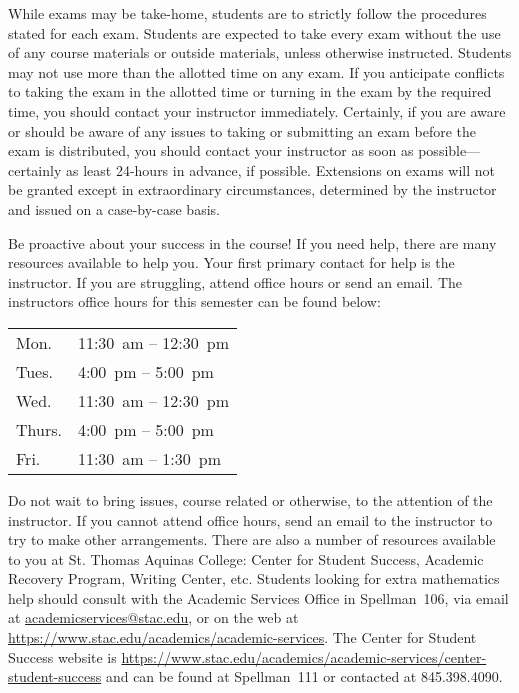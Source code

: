 \documentclass[11pt,letterpaper]{article}
\begin{document}
While exams may be take-home, students are to strictly follow the procedures stated for each exam. Students are expected to take every exam without the use of any course materials or outside materials, unless otherwise instructed. Students may not use more than the allotted time on any exam. If you anticipate conflicts to taking the exam in the allotted time or turning in the exam by the required time, you should contact your instructor immediately. Certainly, if you are aware or should be aware of any issues to taking or submitting an exam before the exam is distributed, you should contact your instructor as soon as possible---certainly as least 24-hours in advance, if possible. Extensions on exams will not be granted except in extraordinary circumstances, determined by the instructor and issued on a case-by-case basis. \sectionbreak



Be proactive about your success in the course! If you need help, there are many resources available to help you. Your first primary contact for help is the instructor. If you are struggling, attend office hours or send an email. The instructors office hours for this semester can be found below: \par
	\begin{table}[!ht]
	\centering
	\begin{tabular}{l || l}
	Mon. & 11:30~am -- 12:30~pm \\
	Tues. & 4:00~pm -- 5:00~pm \\
	Wed. & 11:30~am -- 12:30~pm \\
	Thurs. & 4:00~pm -- 5:00~pm \\
	Fri. & 11:30~am -- 1:30~pm
	\end{tabular}
	\end{table}
Do not wait to bring issues, course related or otherwise, to the attention of the instructor. If you cannot attend office hours, send an email to the instructor to try to make other arrangements. There are also a number of resources available to you at St. Thomas Aquinas College: Center for Student Success, Academic Recovery Program, Writing Center, etc. Students looking for extra mathematics help should consult with the Academic Services Office in Spellman~106, via email at \href{mailto:AcademicServices@stac.edu}{academicservices@stac.edu}, or on the web at \href{https://www.stac.edu/academics/academic-services}{https://www.stac.edu/academics/academic-services}. The Center for Student Success website is \url{https://www.stac.edu/academics/academic-services/center-student-success} and can be found at Spellman~111 or contacted at 845.398.4090. \sectionbreak
\end{document}
